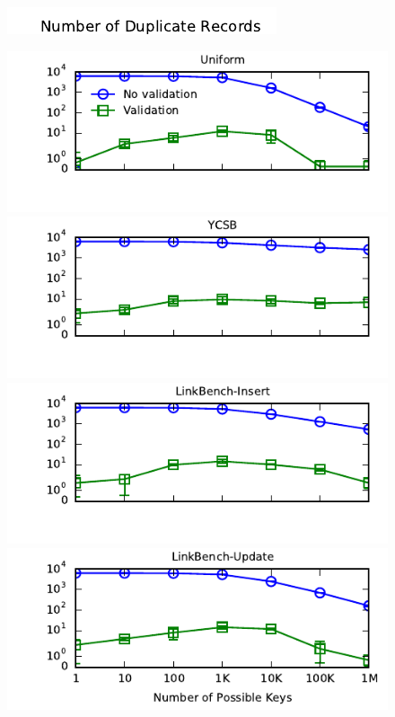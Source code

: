 \begin{figure}

\begin{minipage}[l]{0cm}
\includegraphics[angle=90, width=.185in]{figs/pk-workload-ylabel.pdf}
\end{minipage}
\begin{minipage}{\columnwidth}
\includegraphics[width=1\columnwidth]{figs/pk-workload-uniform-violations.pdf}\vspace{-2em}
\includegraphics[width=1\columnwidth]{figs/pk-workload-ycsb-violations.pdf}\vspace{-2em}
\includegraphics[width=1\columnwidth]{figs/pk-workload-linkbench-ins-violations.pdf}\vspace{-2em}
\includegraphics[width=1\columnwidth]{figs/pk-workload-linkbench-upd-violations.pdf}\vspace{-1em}

\end{minipage}
\end{figure}
